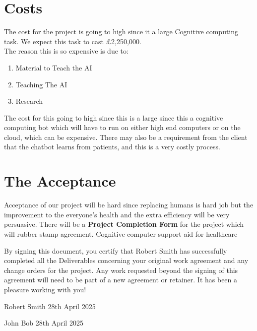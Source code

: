 \documentclass{article}
\begin{document}
\section{Costs}
The cost for the project is going to high since it a large Cognitive computing task. We expect this task to cast £2,250,000. \\
The reason this is so expensive is due to:
\begin{enumerate}
	\item Material to Teach the AI
	\item Teaching The AI
	\item Research 
\end{enumerate}
The cost for this going to high since this is a large since this a cognitive computing bot which will have to run on either high end computers or on the cloud, which can be expensive. There may also be a requirement from the client that the chatbot learns from patients, and this is a very costly process.

\section{The Acceptance}
Acceptance of our project will be hard since replacing humans is hard job but the improvement to the everyone's health and the extra efficiency will be very persuasive. There will be a \textbf{Project Completion Form} for the project which will rubber stamp agreement.
Cognitive computer support aid for healthcare

By signing this document, you certify that Robert Smith has successfully completed all the Deliverables concerning your original work agreement and any change orders for the project. Any work requested beyond the signing of this agreement will need to be part of a new agreement or retainer. 
It has been a pleasure working with you!

\bigskip


Robert Smith
28th April 2025
\bigskip
\bigskip
\bigskip


John Bob
28th April 2025
\end{document}
